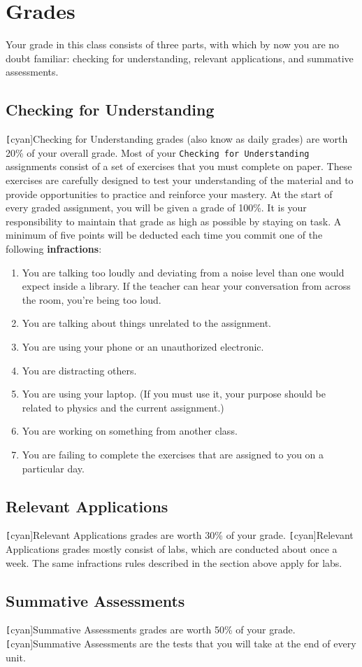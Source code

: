 \documentclass{article}
\begin{document}
\section{Grades}
Your grade in this class consists of three parts, with which by now you are no doubt familiar: checking for understanding, relevant applications, and summative assessments.

\subsection{Checking for Understanding}

\texttt[cyan]{Checking for Understanding} grades (also know as daily grades) are worth 20\% of your overall grade. Most of your \texttt{Checking for Understanding} assignments consist of a set of exercises that you must complete on paper. These exercises are carefully designed to test your understanding of the material and to provide opportunities to practice and reinforce your mastery. At the start of every graded assignment, you will be given a grade of 100\%. It is your responsibility to maintain that grade as high as possible by staying on task. A minimum of five points will be deducted each time you commit one of the following \textbf{infractions}:

\begin{enumerate}
\setlength\itemsep{0.1ex}
    \item You are talking too loudly and deviating from a noise level than one would expect inside a library. If the teacher can hear your conversation from across the room, you're being too loud.
    \item You are talking about things unrelated to the assignment.
    \item You are using your phone or an unauthorized electronic.
    \item You are distracting others.
    \item You are using your laptop. (If you must use it, your purpose should be related to physics and the current assignment.)
    \item You are working on something from another class.
    \item You are failing to complete the exercises that are assigned to you on a particular day.
\end{enumerate}

\subsection{Relevant Applications}
\texttt[cyan]{Relevant Applications} grades are worth 30\% of your grade. \texttt[cyan]{Relevant Applications} grades mostly consist of labs, which are conducted about once a week. The same infractions rules described in the section above apply for labs.

\subsection{Summative Assessments}
\texttt[cyan]{Summative Assessments} grades are worth 50\% of your grade. \texttt[cyan]{Summative Assessments} are the tests that you will take at the end of every unit. 
\end{document}
